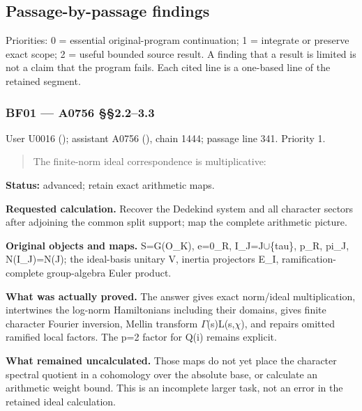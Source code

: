 \subsection{Passage-by-passage
findings}\label{TranscriptLedgerStage:passage-by-passage-findings}

Priorities: 0 = essential original-program continuation; 1 = integrate
or preserve exact scope; 2 = useful bounded source result. A finding
that a result is limited is not a claim that the program fails. Each
cited line is a one-based line of the retained segment.

\subsubsection{BF01 --- A0756 §§2.2--3.3}\label{TranscriptLedgerStage:bf01-a0756-2.23.3}

User U0016 (\protect{});
assistant A0756 (\protect{}),
chain 1444; passage line 341. Priority 1.

\begin{quote}
The finite-norm ideal correspondence is multiplicative:
\end{quote}

\textbf{Status:} advanced; retain exact arithmetic maps.

\textbf{Requested calculation.} Recover the Dedekind system and all
character sectors after adjoining the common split support; map the
complete arithmetic picture.

\textbf{Original objects and maps.} S=G(O\_K), e=0\_R,
I\_J=J\allowbreak{}\ensuremath{∪}\allowbreak{}\{tau\}, p\_R, pi\_J,
N(I\_J)=N(J); the ideal-basis unitary V, inertia projectors E\_I,
ramification-complete group-algebra Euler product.

\textbf{What was actually proved.} The answer gives exact norm/ideal
multiplication, intertwines the log-norm Hamiltonians including their
domains, gives finite character Fourier inversion, Mellin transform
\allowbreak{}\ensuremath{Γ}\allowbreak{}(s)L(s,\allowbreak{}\ensuremath{χ}\allowbreak{}),
and repairs omitted ramified local factors. The p=2 factor for Q(i)
remains explicit.

\textbf{What remained uncalculated.} Those maps do not yet place the
character spectral quotient in a cohomology over the absolute base, or
calculate an arithmetic weight bound. This is an incomplete larger task,
not an error in the retained ideal calculation.

